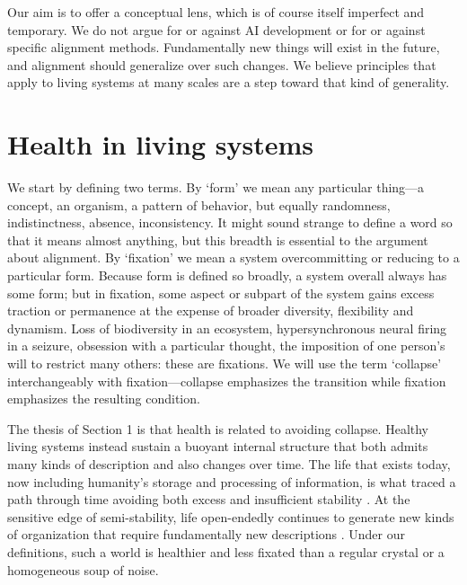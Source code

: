 \documentclass[11pt]{article}
\begin{document}
Our aim is to offer a conceptual lens, which is of course itself imperfect and temporary. We do not argue for or against AI development or for or against specific alignment methods. Fundamentally new things will exist in the future, and alignment should generalize over such changes. We believe principles that apply to living systems at many scales are a step toward that kind of generality.



\section{Health in living systems}

We start by defining two terms. By `form' we mean any particular thing---a concept, an organism, a pattern of behavior, but equally randomness, indistinctness, absence, inconsistency. It might sound strange to define a word so that it means almost anything, but this breadth is essential to the argument about alignment. By `fixation' we mean a system overcommitting or reducing to a particular form. Because form is defined so broadly, a system overall always has some form; but in fixation, some aspect or subpart of the system gains excess traction or permanence at the expense of broader diversity, flexibility and dynamism. Loss of biodiversity in an ecosystem, hypersynchronous neural firing in a seizure, obsession with a particular thought, the imposition of one person's will to restrict many others: these are fixations. We will use the term `collapse' interchangeably with fixation---collapse emphasizes the transition while fixation emphasizes the resulting condition. 

The thesis of Section 1 is that health is related to avoiding collapse. Healthy living systems instead sustain a buoyant internal structure that both admits many kinds of description and also changes over time. The life that exists today, now including humanity's storage and processing of information, is what traced a path through time avoiding both excess and insufficient stability \citep{schrodinger1944what, prigogine1984order, maturana2012autopoiesis}. At the sensitive edge of semi-stability, life open-endedly continues to generate new kinds of organization that require fundamentally new descriptions \citep{kauffman1993origins, stanley2017open, canguilhem1966normal, langton1990computation}. Under our definitions, such a world is healthier and less fixated than a regular crystal or a homogeneous soup of noise.
\end{document}
